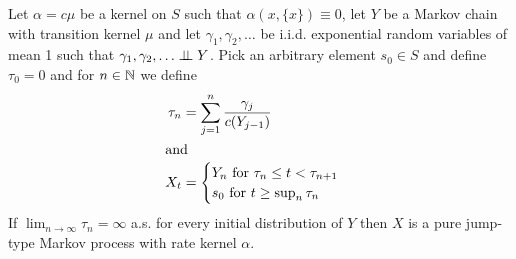 \begin{thm}Let $\alpha = c \mu$ be a kernel on $S$ such that
  $\alpha(x, \lbrace x \rbrace) \equiv 0$, let $Y$ be a Markov chain
  with transition kernel $\mu$ and let $\gamma_1, \gamma_2, \dotsc$ be
  i.i.d. exponential random variables of mean 1 such that $\gamma_1,
  \gamma_2, \dotsc \perp \! \! \! \perp Y$.  Pick an arbitrary element $s_0
  \in S$ and define $\tau_0 = 0$ and for $n
  \in \mathbb{N}$ we define
\begin{align*}
\tau_n &= \sum_{j=1}^n  \frac{\gamma_j}{c(Y_{j-1})} \\
\intertext{and}
X_t &= \begin{cases}
Y_n \text{ for $\tau_n \leq t < \tau_{n+1}$} \\
s_0 \text{ for $t \geq \sup_n \tau_n$} \\
\end{cases}
\end{align*}
If $\lim_{n \to \infty} \tau_n = \infty$ a.s. for every initial distribution
  of $Y$ then $X$ is a pure jump-type Markov process with rate kernel $\alpha$.
\end{thm}
